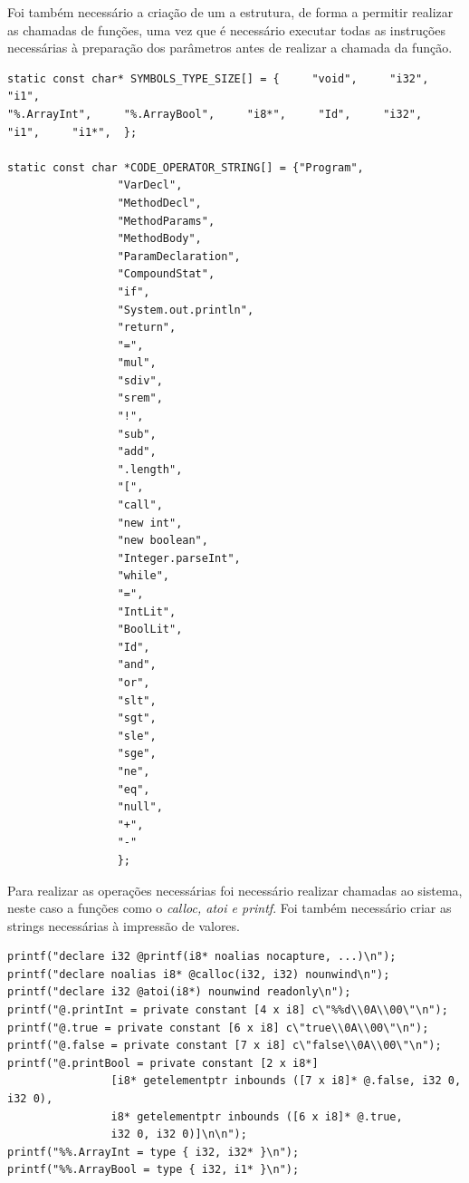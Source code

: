 \documentclass[12pt]{article}
\begin{document}
\par Foi também necessário a criação de um a estrutura, de forma a permitir realizar as chamadas de funções, uma vez que é necessário executar todas as instruções necessárias à preparação dos parâmetros antes de realizar a chamada da função.  

\begin{lstlisting}
static const char* SYMBOLS_TYPE_SIZE[] = {     "void",     "i32",     "i1",
"%.ArrayInt",     "%.ArrayBool",     "i8*",     "Id",     "i32",
"i1",     "i1*",  };

static const char *CODE_OPERATOR_STRING[] = {"Program",
                 "VarDecl",
                 "MethodDecl",
                 "MethodParams",
                 "MethodBody",
                 "ParamDeclaration",
                 "CompoundStat",
                 "if",
                 "System.out.println",
                 "return",
                 "=",
                 "mul",
                 "sdiv",
                 "srem",
                 "!",
                 "sub",
                 "add",
                 ".length",
                 "[",
                 "call",
                 "new int",
                 "new boolean",
                 "Integer.parseInt",
                 "while",
                 "=",
                 "IntLit",
                 "BoolLit",
                 "Id",
                 "and",
                 "or",
                 "slt",
                 "sgt",
                 "sle",
                 "sge",
                 "ne",
                 "eq",
                 "null",
                 "+",
                 "-"
                 };
\end{lstlisting}
\pagebreak
\par Para realizar as operações necessárias foi necessário realizar chamadas ao sistema, neste caso a funções como o \emph{calloc, atoi e printf}. Foi também necessário criar as strings necessárias à impressão de valores.

\begin{lstlisting}
printf("declare i32 @printf(i8* noalias nocapture, ...)\n");
printf("declare noalias i8* @calloc(i32, i32) nounwind\n");
printf("declare i32 @atoi(i8*) nounwind readonly\n");
printf("@.printInt = private constant [4 x i8] c\"%%d\\0A\\00\"\n");
printf("@.true = private constant [6 x i8] c\"true\\0A\\00\"\n");
printf("@.false = private constant [7 x i8] c\"false\\0A\\00\"\n");
printf("@.printBool = private constant [2 x i8*] 
		 		[i8* getelementptr inbounds ([7 x i8]* @.false, i32 0, i32 0),
		 		i8* getelementptr inbounds ([6 x i8]* @.true, 
		 		i32 0, i32 0)]\n\n");
printf("%%.ArrayInt = type { i32, i32* }\n");
printf("%%.ArrayBool = type { i32, i1* }\n");

\end{lstlisting}
\end{document}

